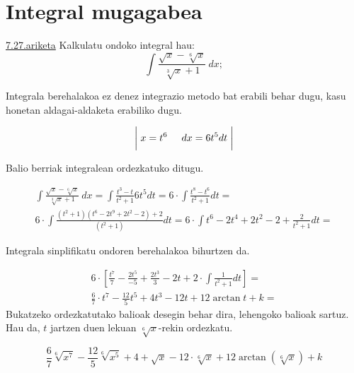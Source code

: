 \chapter{Integral mugagabea}
\underline{7.27.ariketa} Kalkulatu ondoko integral hau:
\begin{equation*}
    \int \frac{\sqrt{x}-\sqrt[6]{x}}{\sqrt[3]{x}+1}\ dx;
\end{equation*}

Integrala berehalakoa ez denez integrazio metodo bat erabili behar dugu, kasu honetan aldagai-aldaketa erabiliko dugu. 

\begin{equation*}
\biggr\rvert\hspace{0.1cm} x=t^6\hspace{0.5cm} dx=6t^5dt\hspace{0.1cm}\biggr\rvert
\end{equation*}

Balio berriak integralean ordezkatuko ditugu. 

\begin{equation*}
    \begin{split}
        \int \frac{\sqrt{x}-\sqrt[6]{x}}{\sqrt[3]{x}+1}\ dx = \int \frac{t^3-t}{t^2+1}6t^5dt = 6 \cdot \int \frac{t^8-t^6}{t^2+1}dt = \\ 6 \cdot \int \frac{(t^2+1)(t^6-2t^9+2t^2-2)+2}{(t^2+1)}dt = 6 \cdot \int t^6-2t^4+2t^2-2+\frac{2}{t^2+1}dt = 
    \end{split}
\end{equation*}

Integrala sinplifikatu ondoren berehalakoa bihurtzen da.

\begin{equation*}
     \begin{split}
        6 \cdot                  \left[\frac{t^7}{7}-\frac{2t^5}{-5}+\frac{2t^3}{3}-2t+2\cdot\int \frac{1}{t^2+1}dt\right] = \\ \frac{6}{7} \cdot t^7 - \frac{12}{5}t^5+4t^3-12t+12\arctan{t} + k =
    \end{split}
\end{equation*}
Bukatzeko ordezkatutako balioak desegin behar dira, lehengoko balioak sartuz. Hau da, $t$ jartzen duen lekuan $\sqrt[6]{x}$-rekin ordezkatu.

\begin{equation*}
    \frac{6}{7}\sqrt[6]{x^7}-\frac{12}{5}\sqrt[6]{x^5}+4+\sqrt{x}-12\cdot\sqrt[6]{x}+12\arctan{(\sqrt[6]{x})}+k
\end{equation*}


